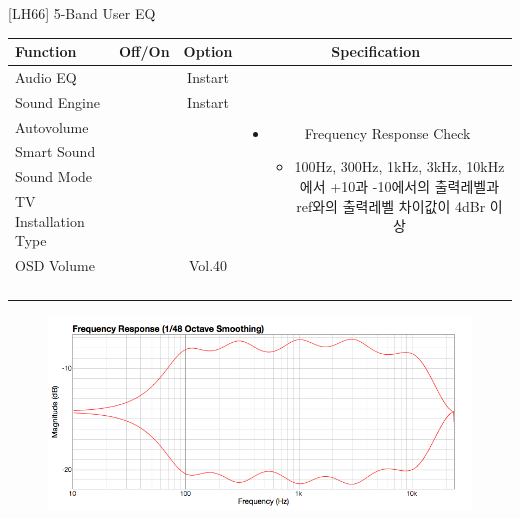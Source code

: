 \begin{frame}[t]{[LH66] 5-Band User EQ}
\begin{tiny}
\begin{tabular}{@{}lccc@{}}
\toprule
Function & Off/On & Option & Specification \\
\midrule
Audio EQ & \color{black}{Off} & Instart &
\multirow{10}{60mm}{
\begin{itemize}
\item Frequency Response Check
	\begin{itemize}
	\item 100Hz, 300Hz, 1kHz, 3kHz, 10kHz에서 +10과 -10에서의 출력레벨과 ref와의 출력레벨 차이값이 4dBr 이상
	\end{itemize}
\end{itemize}
} \\
Sound Engine & \color{blue}{On} & Instart & \\
Autovolume & \color{black}{Off} & & \\
Smart Sound & \color{black}{Off} & & \\
Sound Mode & \color{blue}{On} & \color{blue}{User EQ±10} & \\
TV Installation Type & \color{blue}{On} & \color{blue}{Standtype1} & \\
OSD Volume & \color{blue}{On} & Vol.40 & \\
& & & \\
& & & \\
& & & \\
& & & \\
\midrule
\end{tabular}
\end{tiny}

\begin{figure}[b]
\includegraphics[height=0.4\textwidth]{figures/5_band_user_eq.png}
\end{figure}

\end{frame}

